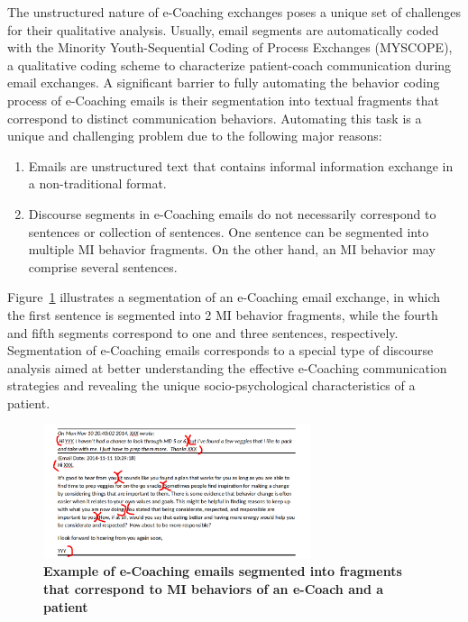 \documentclass{amia}
\begin{document}
The unstructured nature of e-Coaching exchanges poses a unique set of challenges for their qualitative analysis. Usually, email segments are automatically coded with the Minority Youth-Sequential Coding of Process Exchanges (MYSCOPE), \cite{carcone2013provider} a qualitative coding scheme to characterize patient-coach communication during email exchanges. A significant barrier to fully automating the behavior coding process of e-Coaching emails is their segmentation into textual fragments that correspond to distinct communication behaviors. Automating this task is a unique and challenging problem due to the following major reasons:

\begin{enumerate}
\item Emails are unstructured text that contains informal information exchange in a non-traditional format.
\item Discourse segments in e-Coaching emails do not necessarily correspond to sentences or collection of sentences. One sentence can be segmented into multiple MI behavior fragments. On the other hand, an MI behavior may comprise several sentences.
\end{enumerate}

Figure~\ref{fig:text-segment} illustrates a segmentation of an e-Coaching email exchange, in which the first sentence is segmented into 2 MI behavior fragments, while the fourth and fifth segments correspond to one and three sentences, respectively. Segmentation of e-Coaching emails corresponds to a special type of discourse analysis \cite{webber2012discourse} aimed at better understanding the effective e-Coaching communication strategies and revealing the unique socio-psychological characteristics of a patient.

\begin{figure}[!htb]
    \centering
    \includegraphics[width=0.7\textwidth]{figures/segment-example.png}
    \caption{\textbf{Example of e-Coaching emails segmented into fragments that correspond to MI behaviors of an e-Coach and a patient}}
    \label{fig:text-segment}
\end{figure}
\end{document}
